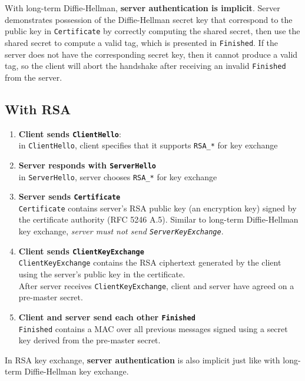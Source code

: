 \documentclass{article}
\begin{document}
With long-term Diffie-Hellman, \textbf{server authentication is implicit}. Server demonstrates possession of the Diffie-Hellman secret key that correspond to the public key in \texttt{Certificate} by correctly computing the shared secret, then use the shared secret to compute a valid tag, which is presented in \texttt{Finished}. If the server does not have the corresponding secret key, then it cannot produce a valid tag, so the client will abort the handshake after receiving an invalid \texttt{Finished} from the server.

\subsection{With RSA}
\begin{enumerate}
    \item \textbf{Client sends \texttt{ClientHello}}: \\ in \texttt{ClientHello}, client specifies that it supports \texttt{RSA\_*} for key exchange
    \item \textbf{Server responds with \texttt{ServerHello}} \\ in \texttt{ServerHello}, server chooses \texttt{RSA\_*} for key exchange
    \item \textbf{Server sends \texttt{Certificate}} \\ \texttt{Certificate} contains server's RSA public key (an encryption key) signed by the certificate authority (RFC 5246 A.5). Similar to long-term Diffie-Hellman key exchange, \textit{server must not send \texttt{ServerKeyExchange}}.
    \item \textbf{Client sends \texttt{ClientKeyExchange}} \\ \texttt{ClientKeyExchange} contains the RSA ciphertext generated by the client using the server's public key in the certificate. \\ After server receives \texttt{ClientKeyExchange}, client and server have agreed on a pre-master secret.
    \item \textbf{Client and server send each other \texttt{Finished}} \\ \texttt{Finished} contains a MAC over all previous messages signed using a secret key derived from the pre-master secret.
\end{enumerate}

In RSA key exchange, \textbf{server authentication} is also implicit just like with long-term Diffie-Hellman key exchange.
\end{document}
